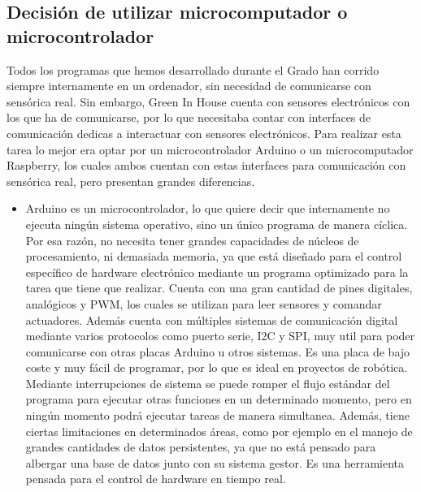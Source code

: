     \subsection{Decisión de utilizar microcomputador o microcontrolador} 
    Todos los programas que hemos desarrollado durante el Grado han corrido siempre internamente en un ordenador, sin necesidad de comunicarse con sensórica real. Sin embargo, Green In House cuenta con sensores electrónicos con los que ha de comunicarse, por lo que necesitaba contar con interfaces de comunicación dedicas a interactuar con sensores electrónicos. Para realizar esta tarea lo mejor era optar por un microcontrolador Arduino o un microcomputador Raspberry, los cuales ambos cuentan con estas interfaces para comunicación con sensórica real, pero presentan grandes diferencias.
    \begin{itemize}
        \item Arduino es un microcontrolador, lo que quiere decir que internamente no ejecuta ningún sistema operativo, sino un único programa de manera cíclica. Por esa razón, no necesita tener grandes capacidades de núcleos de procesamiento, ni demasiada memoria, ya que está diseñado para el control específico de hardware electrónico mediante un programa optimizado para la tarea que tiene que realizar. Cuenta con una gran cantidad de pines digitales, analógicos y PWM, los cuales se utilizan para leer sensores y comandar actuadores. Además cuenta con múltiples sistemas de comunicación digital mediante varios protocolos como puerto serie, I2C y SPI, muy util para poder comunicarse con otras placas Arduino u otros sistemas. Es una placa de bajo coste y muy fácil de programar, por lo que es ideal en proyectos de robótica. Mediante interrupciones de sistema se puede romper el flujo estándar del programa para ejecutar otras funciones en un determinado momento, pero en ningún momento podrá ejecutar tareas de manera simultanea. Además, tiene ciertas limitaciones en determinados áreas, como por ejemplo en el manejo de grandes cantidades de datos persistentes, ya que no está pensado para albergar una base de datos junto con su sistema gestor. Es una herramienta pensada para el control de hardware en tiempo real.

\end{itemize}
